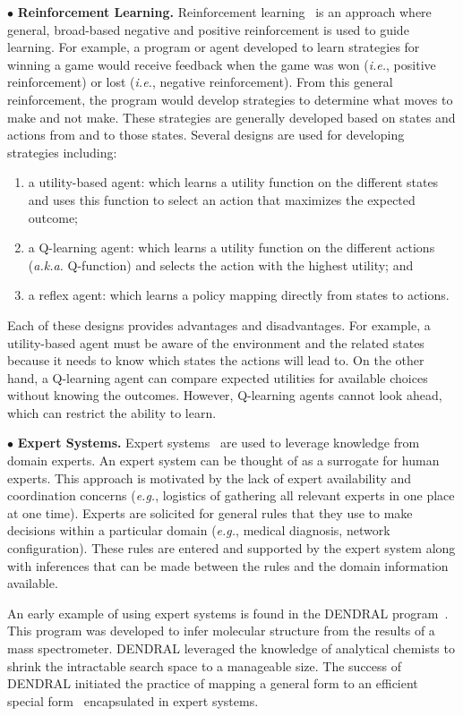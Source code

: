 \documentclass[conference]{IEEEtran}
\begin{document}
$\bullet$ {\bf Reinforcement Learning.}  Reinforcement learning~\cite{Kober:13}\cite{Russell:10}
is an approach where general, broad-based negative and positive reinforcement is used to guide learning. For example, a program or agent developed to learn strategies for winning a game would receive feedback when the game was won (\emph{i.e.}, positive reinforcement) or lost (\emph{i.e.}, negative reinforcement). From this general reinforcement, the program would develop strategies to determine what moves to make and not make.
These strategies are generally developed based on states and actions from and to those states. Several designs are used for developing strategies including:
\begin{enumerate}
\item a utility-based agent: which learns a utility function on the different states and uses this function to select an action that maximizes the expected outcome;
\item a Q-learning agent: which learns a utility function on the different actions (\emph{a.k.a.} Q-function) and selects the action with the highest utility; and
\item a reflex agent: which learns a policy mapping directly from states to actions.
\end{enumerate}

Each of these designs provides advantages and disadvantages. For example, a utility-based agent must be aware of the environment and the related states because it needs to know which states the actions will lead to. On the other hand, a Q-learning agent can compare expected utilities for available choices without knowing the outcomes. However, Q-learning agents cannot look ahead, which can restrict the ability to learn.

$\bullet$ {\bf Expert Systems.}  Expert systems~\cite{Russell:10} are used to leverage
knowledge from domain experts. An expert system can be thought of as a surrogate for
human experts. This approach is motivated by the lack of expert availability and coordination concerns (\emph{e.g.}, logistics of gathering all relevant experts in one place at one time). Experts are solicited for general
rules that they use to make decisions within a particular domain (\emph{e.g.}, medical diagnosis, network configuration). These rules are entered and supported by the expert system along with inferences that can be made between the rules and the domain information available.

An early example of using expert systems is found in the DENDRAL program~\cite{Buchanan:69}. This program was developed to infer molecular structure from the results of a mass spectrometer. DENDRAL leveraged the knowledge of analytical chemists to shrink the intractable search space to a manageable size. The success of DENDRAL initiated the practice of mapping a general form to an efficient special form~\cite{Feigenbaum:71} encapsulated in expert systems.
\end{document}

